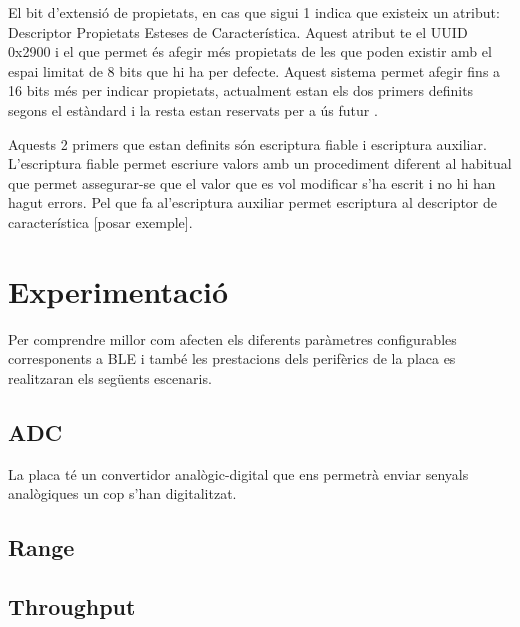 El bit d'extensió de propietats, en cas que sigui 1 indica que existeix un atribut: Descriptor Propietats Esteses de Característica.
Aquest atribut te el UUID 0x2900 i el que permet és afegir més propietats de les que poden existir amb el espai limitat de 8 bits que hi ha per defecte.
Aquest sistema permet afegir fins a 16 bits més per indicar propietats, actualment estan els dos primers definits segons el estàndard i la resta estan reservats per a ús futur \cite{extended properties}.

Aquests 2 primers que estan definits són escriptura fiable i escriptura auxiliar.
L'escriptura fiable permet escriure valors amb un procediment diferent al habitual que permet assegurar-se que el valor que es vol modificar s'ha escrit i no hi han hagut errors.
Pel que fa  al'escriptura auxiliar permet escriptura al descriptor de característica [posar exemple].

\section{Experimentació}
Per comprendre millor com afecten els diferents paràmetres configurables corresponents a BLE i també les prestacions dels perifèrics de la placa es realitzaran els següents escenaris.

\subsection{ADC}
La placa té un convertidor analògic-digital que ens permetrà enviar senyals analògiques un cop s'han digitalitzat.


\subsection{Range}
\subsection{Throughput}
